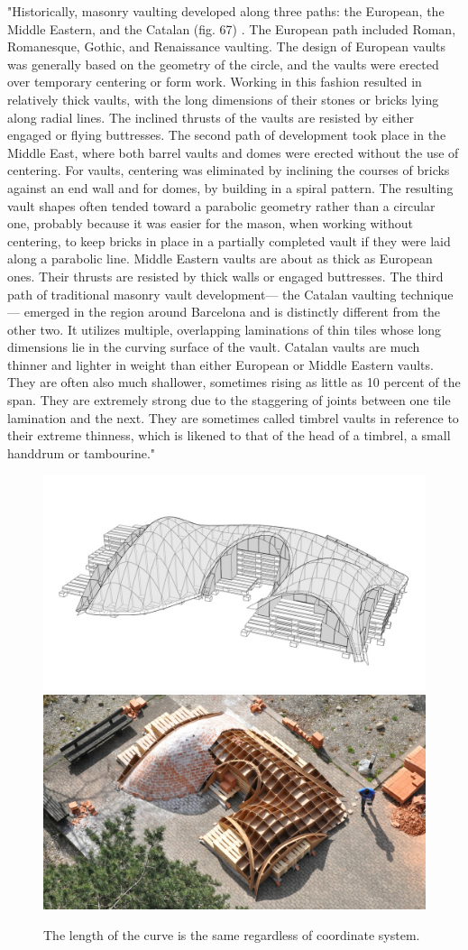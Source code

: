 "Historically, masonry vaulting developed along three paths: the European, the Middle Eastern, and the Catalan (fig. 67) . The European path included Roman, Romanesque, Gothic, and Renaissance vaulting. The design of European vaults was generally based on the geometry of the circle, and the vaults were erected over temporary centering or form work. Working in this fashion resulted in relatively thick vaults, with the long dimensions of their stones or bricks lying along radial lines. The inclined thrusts of the vaults are resisted by either engaged or flying buttresses. 
The second path of development took place in the Middle East, where both barrel vaults and domes were erected without the use of centering. For vaults, centering was eliminated by inclining the courses of bricks against an end wall and for domes, by building in a spiral pattern. The resulting vault shapes often tended toward a parabolic geometry rather than a circular one, probably because it was easier for the mason, when working without centering, to keep bricks in place in a partially completed vault if they were laid along a parabolic line. Middle Eastern vaults are about as thick as European ones. Their thrusts are resisted by thick walls or engaged buttresses.
The third path of traditional masonry vault development— the Catalan vaulting technique— emerged in the region around Barcelona and is distinctly different from the other two. It utilizes multiple, overlapping laminations of thin tiles whose long dimensions lie in the curving surface of the vault. Catalan vaults are much thinner and lighter in weight than either European or Middle Eastern vaults. They are often also much shallower, sometimes rising as little as 10 percent of the span. They are extremely strong due to the staggering of joints between one tile lamination and the next. They are sometimes called timbrel vaults in reference to their extreme thinness, which is likened to that of the head of a timbrel, a small handdrum or tambourine."



\begin{figure}[H]
\centering
\includegraphics[width=0.45\linewidth ]{figure/Introduction/VaultBlock2.jpg}
\includegraphics[width=0.45\linewidth ]{figure/Introduction/VaultBlock.jpg}

\caption{The length of the curve is the same regardless of coordinate system.}
\end{figure}






